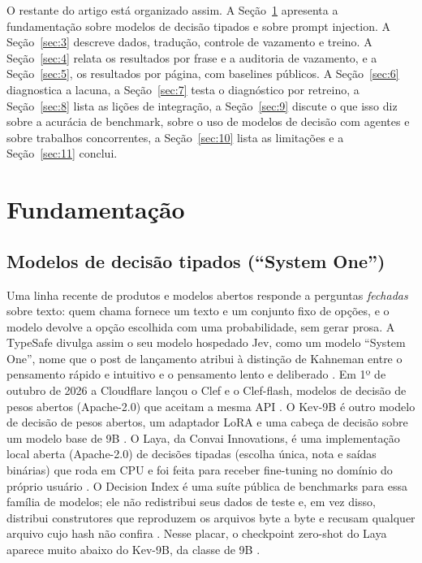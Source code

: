 \documentclass[11pt]{article}
\begin{document}
O restante do artigo está organizado assim. A Seção~\ref{sec:2} apresenta a fundamentação sobre modelos de decisão tipados e sobre prompt injection. A Seção~\ref{sec:3} descreve dados, tradução, controle de vazamento e treino. A Seção~\ref{sec:4} relata os resultados por frase e a auditoria de vazamento, e a Seção~\ref{sec:5}, os resultados por página, com baselines públicos. A Seção~\ref{sec:6} diagnostica a lacuna, a Seção~\ref{sec:7} testa o diagnóstico por retreino, a Seção~\ref{sec:8} lista as lições de integração, a Seção~\ref{sec:9} discute o que isso diz sobre a acurácia de benchmark, sobre o uso de modelos de decisão com agentes e sobre trabalhos concorrentes, a Seção~\ref{sec:10} lista as limitações e a Seção~\ref{sec:11} conclui.

\section{Fundamentação}\label{sec:2}

\subsection{Modelos de decisão tipados (``System One'')}\label{sec:2.1}

Uma linha recente de produtos e modelos abertos responde a perguntas \emph{fechadas} sobre texto: quem chama fornece um texto e um conjunto fixo de opções, e o modelo devolve a opção escolhida com uma probabilidade, sem gerar prosa. A TypeSafe divulga assim o seu modelo hospedado Jev, como um modelo ``System One'', nome que o post de lançamento atribui à distinção de Kahneman entre o pensamento rápido e intuitivo e o pensamento lento e deliberado \citep{typesafe2026jev, kahneman2011thinking}. Em 1º de outubro de 2026 a Cloudflare lançou o Clef e o Clef-flash, modelos de decisão de pesos abertos (Apache-2.0) que aceitam a mesma API \citep{cloudflare2026clef, cloudflare2026clefflash}. %
O Kev-9B é outro modelo de decisão de pesos abertos, um adaptador LoRA e uma cabeça de decisão sobre um modelo base de 9B \citep{palmer2026kev9b}. O Laya, da Convai Innovations, é uma implementação local aberta (Apache-2.0) de decisões tipadas (escolha única, nota e saídas binárias) que roda em CPU e foi feita para receber fine-tuning no domínio do próprio usuário \citep{convai2026laya}. %
O Decision Index é uma suíte pública de benchmarks para essa família de modelos; ele não redistribui seus dados de teste e, em vez disso, distribui construtores que reproduzem os arquivos byte a byte e recusam qualquer arquivo cujo hash não confira %
\citep{decisionindex2026}. Nesse placar, o checkpoint zero-shot do Laya aparece muito abaixo do Kev-9B, da classe de 9B \citep{decisionindex2026}. %
\end{document}
